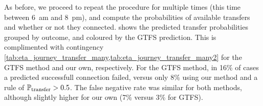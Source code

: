 \begin{knitrout}
\color{fgcolor}\begin{table}

\caption{\label{tab:eta_journey_transfer_res}Transfer probabilities}
\centering
{}
\end{table}


\end{knitrout}


As before, we proceed to repeat the procedure for multiple times (this time between 6~am and 8~pm), and compute the probabilities of available transfers and whether or not they connected.  shows the predicted transfer probabilities grouped by outcome, and coloured by the GTFS prediction. This is complimented with contingency \cref{tab:eta_journey_transfer_many,tab:eta_journey_transfer_many2} for the GTFS method and our own, respectively. For the GTFS method, in 16\% of cases a predicted successfull connection failed, versus only 8\% using our method and a rule of $\mathbb{P}_\text{transfer} > 0.5$. The false negative rate was similar for both methods, although slightly higher for our own (7\% versus 3\% for GTFS).


